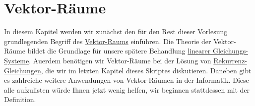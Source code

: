 \chapter{Vektor-R\"{a}ume}
In diesem Kapitel werden wir zun\"{a}chst den f\"{u}r den Rest dieser Vorlesung grundlegenden
Begriff des \href{https://de.wikipedia.org/wiki/Vektorraum}{Vektor-Raums}
einf\"{u}hren.  Die Theorie der Vektor-R\"{a}ume bildet die Grundlage f\"{u}r unsere sp\"{a}tere
Behandlung \href{https://de.wikipedia.org/wiki/Lineares_Gleichungssystem}{linearer Gleichungs-Systeme}. 
Au\3erdem ben\"{o}tigen wir Vektor-R\"{a}ume bei der L\"{o}sung von
\href{https://en.wikipedia.org/wiki/Recurrence_relation}{Rekurrenz-Gleichungen}, die wir im letzten  
Kapitel dieses Skriptes diskutieren.  Daneben gibt es zahlreiche weitere Anwendungen von Vektor-R\"{a}umen in der
Informatik.  Diese alle aufzulisten w\"{u}rde Ihnen jetzt wenig helfen, wir beginnen stattdessen mit
der Definition. 

\renewcommand{\labelenumi}{\arabic{enumi}.}
\renewcommand{\labelenumii}{(\alph{enumii})}

